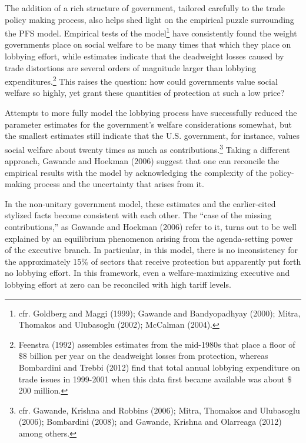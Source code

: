 \documentclass[10pt]{article}
\begin{document}
The addition of a rich structure of government, tailored carefully to the trade policy making process, also helps shed light on the empirical puzzle surrounding the PFS model. Empirical tests of the model\footnote{cfr. Goldberg and Maggi (1999); Gawande and Bandyopadhyay (2000); Mitra, Thomakos and Ulubasoglu (2002); McCalman (2004).\label{fn:gh_lobby}} have consistently found the weight governments place on social welfare to be many times that which they place on lobbying effort, while estimates indicate that the deadweight losses caused by trade distortions are several orders of magnitude larger than lobbying expenditures.\footnote{Feenstra (1992) assembles estimates from the mid-1980s that place a floor of $\$$8 billion per year on the deadweight losses from protection, whereas Bombardini and Trebbi (2012) find that total annual lobbying expenditure on trade issues in 1999-2001 when this data first became available was about $\$$200 million.} This raises the question: how could governments value social welfare so highly, yet grant these quantities of protection at such a low price?

Attempts to more fully model the lobbying process have successfully reduced the parameter estimates for the government's welfare considerations somewhat, but the smallest estimates still indicate that the U.S. government, for instance, values social welfare about twenty times as much as contributions.\footnote{cfr. Gawande, Krishna and Robbins (2006); Mitra, Thomakos and Ulubasoglu (2006); Bombardini (2008); and Gawande, Krishna and Olarreaga (2012) among others.} Taking a different approach, Gawande and Hoekman (2006) suggest that one can reconcile the empirical results with the model by acknowledging the complexity of the policy-making process and the uncertainty that arises from it.

In the non-unitary government model, these estimates and the earlier-cited stylized facts become consistent with each other. The ``case of the missing contributions,'' as Gawande and Hoekman (2006) refer to it, turns out to be well explained by an equilibrium phenomenon arising from the agenda-setting power of the executive branch. In particular, in this model, there is no inconsistency for the approximately 15$\%$ of sectors that receive protection but apparently put forth no lobbying effort. In this framework, even a welfare-maximizing executive and lobbying effort at zero can be reconciled with high tariff levels.
\end{document}

